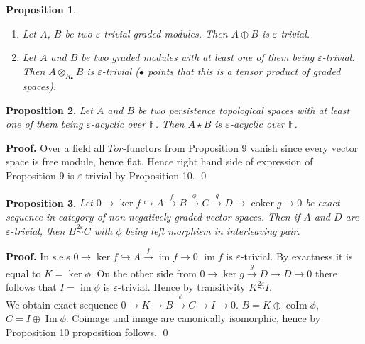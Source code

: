 \documentclass[a4paper, 12pt]{article}
\newtheorem{proposition}{Proposition}
\theoremstyle{definition}
\theoremstyle{remark}
\newenvironment{pf}{\noindent\textbf{Proof.}}{\qed}
\begin{document}
\begin{proposition} ~ \par
  \begin{enumerate}
    \item Let $A$, $B$ be two $\varepsilon$-trivial graded modules. Then $A \oplus B$ is $\varepsilon$-trivial.
    \item Let $A$ and $B$ be two graded modules with at least one of them being $\varepsilon$-trivial. Then $A \otimes_{R_{\bullet}} B$ is $\varepsilon$-trivial ($\bullet$ points that this is a tensor product of graded spaces).
  \end{enumerate}
\end{proposition}

\begin{proposition}
  Let $A$ and $B$ be two persistence topological spaces with at least one of them being $\varepsilon$-acyclic over $\mathbb{F}$. Then $A \star B$ is $\varepsilon$-acyclic over $\mathbb{F}$.
\end{proposition}

\begin{pf}
  Over a field all $Tor$-functors from Proposition 9 vanish since every vector space is free module, hence flat. Hence right hand side of expression of Proposition 9 is $\varepsilon$-trivial by Proposition 10.
\end{pf}

\begin{proposition}
  Let $0 \to \ker{f} \hookrightarrow A \xrightarrow{f} B \xrightarrow{\phi} C \xrightarrow{g} D \to \operatorname{coker}g \to 0$ be exact sequence in category of non-negatively graded vector spaces. Then if $A$ and $D$ are $\varepsilon$-trivial, then $B \stackrel{2\varepsilon}{\sim} C$ with $\phi$ being left morphism in interleaving pair.
\end{proposition}

\begin{pf}
  In s.e.s $0 \to \ker{f} \hookrightarrow A \xrightarrow{f} \operatorname{im}f \to 0$ $\operatorname{im}f$ is $\varepsilon$-trivial. By exactness it is equal to $K = \ker \phi$. On the other side from $0 \to \ker{g} \xrightarrow{g} D \to D \to 0$ there follows that $I = \operatorname{im} \phi$ is $\varepsilon$-trivial. Hence by transitivity $K \stackrel{2\varepsilon}{\sim} I$.\\

  We obtain exact sequence $0 \to K \to B \xrightarrow{\phi} C \to I \to 0$. $B = K \oplus \operatorname{coIm}\phi$, $C = I \oplus \operatorname{Im} \phi$. Coimage and image are canonically isomorphic, hence by Proposition 10 proposition follows.
\end{pf}\\
\end{document}
